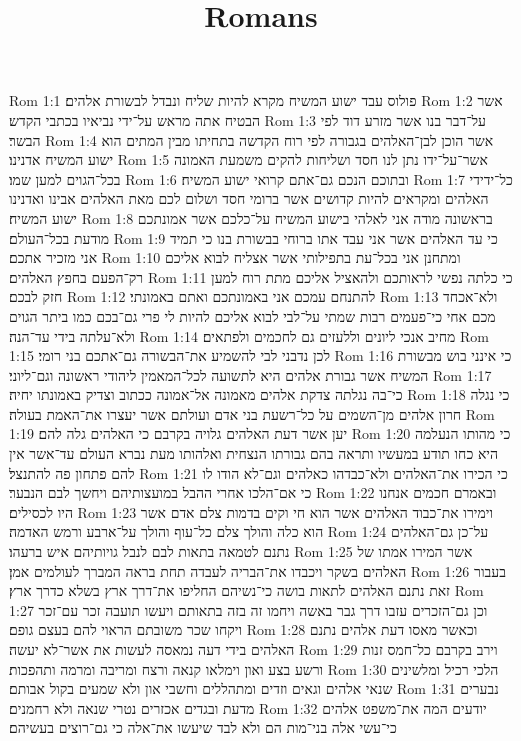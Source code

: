 

\title{Romans}

Rom 1:1  פולוס עבד ישוע המשיח מקרא להיות שליח ונבדל לבשורת אלהים׃
Rom 1:2  אשר הבטיח אתה מראש על־ידי נביאיו בכתבי הקדש׃
Rom 1:3  על־דבר בנו אשר מזרע דוד לפי הבשר׃
Rom 1:4  אשר הוכן לבן־האלהים בגבורה לפי רוח הקדשה בתחיתו מבין המתים הוא ישוע המשיח אדנינו׃
Rom 1:5  אשר־על־ידו נתן לנו חסד ושליחות להקים משמעת האמונה בכל־הגוים למען שמו׃
Rom 1:6  ובתוכם הנכם גם־אתם קרואי ישוע המשיח׃
Rom 1:7  כל־ידידי האלהים ומקראים להיות קדושים אשר ברומי חסד ושלום לכם מאת האלהים אבינו ואדנינו ישוע המשיח׃
Rom 1:8  בראשונה מודה אני לאלהי בישוע המשיח על־כלכם אשר אמונתכם מודעת בכל־העולם׃
Rom 1:9  כי עד האלהים אשר אני עבד אתו ברוחי בבשורת בנו כי תמיד אני מזכיר אתכם׃
Rom 1:10  ומתחנן אני בכל־עת בתפילותי אשר אצליח לבוא אליכם רק־הפעם בחפץ האלהים׃
Rom 1:11  כי כלתה נפשי לראותכם ולהאציל אליכם מתת רוח למען חזק לבכם׃
Rom 1:12  להתנחם עמכם אני באמונתכם ואתם באמונתי׃
Rom 1:13  ולא־אכחד מכם אחי כי־פעמים רבות שמתי על־לבי לבוא אליכם להיות לי פרי גם־בכם כמו ביתר הגוים ולא־עלתה בידי עד־הנה׃
Rom 1:14  מחיב אנכי ליונים וללעזים גם לחכמים ולפתאים׃
Rom 1:15  לכן נדבני לבי להשמיע את־הבשורה גם־אתכם בני רומי׃
Rom 1:16  כי אינני בוש מבשורת המשיח אשר גבורת אלהים היא לתשועה לכל־המאמין ליהודי ראשונה וגם־ליוני׃
Rom 1:17  כי־בה נגלתה צדקת אלהים מאמונה אל־אמונה ככתוב וצדיק באמונתו יחיה׃
Rom 1:18  כי נגלה חרון אלהים מן־השמים על כל־רשעת בני אדם ועולתם אשר יעצרו את־האמת בעולה׃
Rom 1:19  יען אשר דעת האלהים גלויה בקרבם כי האלהים גלה להם׃
Rom 1:20  כי מהותו הנעלמה היא כחו תודע במעשיו ותראה בהם גבורתו הנצחית ואלהותו מעת נברא העולם עד־אשר אין להם פתחון פה להתנצל׃
Rom 1:21  כי הכירו את־האלהים ולא־כבדהו כאלהים וגם־לא הודו לו כי אם־הלכו אחרי ההבל במועצותיהם ויחשך לבם הנבער׃
Rom 1:22  ובאמרם חכמים אנחנו היו לכסילים׃
Rom 1:23  וימירו את־כבוד האלהים אשר הוא חי וקים בדמות צלם אדם אשר הוא כלה והולך צלם כל־עוף והולך על־ארבע ורמש האדמה׃
Rom 1:24  על־כן גם־האלהים נתנם לטמאה בתאות לבם לנבל גויותיהם איש ברעהו׃
Rom 1:25  אשר המירו אמתו של האלהים בשקר ויכבדו את־הבריה לעבדה תחת בראה המברך לעולמים אמן׃
Rom 1:26  בעבור זאת נתנם האלהים לתאות בושה כי־נשיהם החליפו את־דרך ארץ בשלא כדרך ארץ׃
Rom 1:27  וכן גם־הזכרים עזבו דרך גבר באשה ויחמו זה בזה בתאותם ויעשו תועבה זכר עם־זכר ויקחו שכר משובתם הראוי להם בעצם גופם׃
Rom 1:28  וכאשר מאסו דעת אלהים נתנם האלהים בידי דעה נמאסה לעשות את אשר־לא יעשה׃
Rom 1:29  וירב בקרבם כל־חמס זנות ורשע בצע ואון וימלאו קנאה ורצח ומריבה ומרמה ותהפכות׃
Rom 1:30  הלכי רכיל ומלשינים שנאי אלהים וגאים וזדים ומתהללים וחשבי און ולא שמעים בקול אבותם׃
Rom 1:31  נבערים מדעת ובגדים אכזרים נטרי שנאה ולא רחמנים׃
Rom 1:32  יודעים המה את־משפט אלהים כי־עשי אלה בני־מות הם ולא לבד שיעשו את־אלה כי גם־רוצים בעשיהם׃
